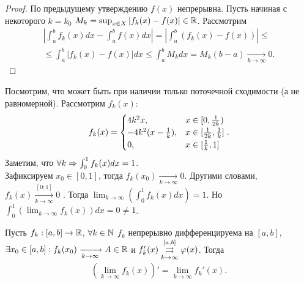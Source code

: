 \documentclass[../main.tex]{subfiles}
\begin{document}
 
 \begin{proof}
   По предыдущему утверждению $ f(x)$ непрерывна. Пусть начиная с некоторого $ k = k_0$ $ M_k = \sup_{x\in X} \left| f_k(x)  - f(x)  \right| \in \R$. Рассмотрим 
   \begin{multline} 
     \left| \int_{a}^{b} f_k(x) dx - \int_{a}^{b} f(x) dx \right|  = \left| \int_{a}^{b} \left( f_k(x) - f(x) \right) \right| \leq \\ \leq \int_{a}^{b} \left| f_k(x) - f(x)  \right| dx \leq \int_{a}^{b} M_k dx  = M_k (b-a)   \xrightarrow[k \to  \infty ]{} 0 .
   \end{multline}
 \end{proof}

 \begin{example}
   Посмотрим, что может быть при наличии только поточечной сходимости (а не равномерной). Рассмотрим $ f_k(x)  $: 
   \begin{gather} 
     f_k(x) = \System{4k^{2}x, &x \in [0, \frac{1}{2k})\\ -4k^{2}(x-\frac{1}{k}), &x \in [\frac{1}{2k}, \frac{1}{k}] \\ 0, &x \in [\frac{1}{k}, 1]} .
   \end{gather} 
   Заметим, что $ \forall k \hence \int_{0}^{1} f_k(x) dx = 1$. \\
   Зафиксируем $ x_0 \in [0, 1]$, тогда $ f_k (x_0 )  \xrightarrow[k \to  \infty ]{} 0 $. Другими словами, $ f_k(x)  \xrightarrow[k \to  \infty ]{[0;1]} 0 $ . Тогда $ \lim_{k \to \infty} \left(\int_{0}^{1} f_k(x) dx\right) = 1$. Но $ \int_{0}^{1} \left(\lim_{k \to \infty} f_k(x) \right)dx = 0 \neq 1$.    
 \end{example}

 
 
 \begin{proposition}
   Пусть $ f_k : [a,b] \to \R$, $ \forall k \in \N$ $ f_k $ непрерывно дифференцируема на $ [a, b]$, $ \exists x_0 \in [a,b] : f_k (x_0 )  \xrightarrow[k \to  \infty ]{} A \in \R$ и $ f'_k (x) \convergesuniformly{k \to \infty}{[a,b]} \phi(x)$. Тогда 
   \begin{gather} 
     \left(\lim_{k \to \infty} f_k(x)  \right)' = \lim_{k \to \infty} f_k'(x) .
   \end{gather}    
 \end{proposition}
 
\end{document}
